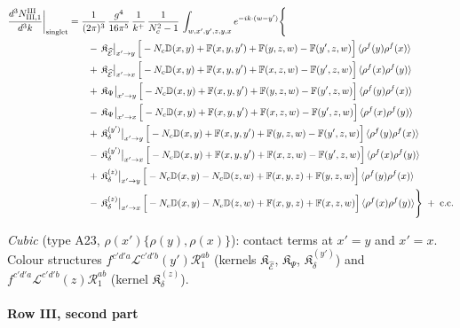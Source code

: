 \documentclass[10pt]{article}
\def\mf#1{\mathbb{#1}}
\begin{document}
\begin{align}
\frac{d^{3}N^{\rm III}_{{\rm III},1}}{d^{3}k}\bigg|_{\rm singlet}&=\frac{1}{(2\pi)^{3}}\,\frac{g^{4}}{16\pi^{5}}\,\frac{1}{k^{+}}\,\frac{1}{N_{c}^{2}-1}\,\int_{w,x',y',z,y,x}e^{-ik\cdot(w-y')}\Bigg\{\notag\\
&\qquad -\,\mathfrak{K}_{\widehat{\mathcal{E}}}\big|_{x'\to y}\,\Big[-N_{c}\mf{D}(x,y)+\mf{F}(x,y,y')+\mf{F}(y,z,w)-\mf{F}(y',z,w)\Big]\,\langle\rho^{f}(y)\rho^{f}(x)\rangle\notag\\
&\qquad +\,\mathfrak{K}_{\widehat{\mathcal{E}}}\big|_{x'\to x}\,\Big[-N_{c}\mf{D}(x,y)+\mf{F}(x,y,y')+\mf{F}(x,z,w)-\mf{F}(y',z,w)\Big]\,\langle\rho^{f}(x)\rho^{f}(y)\rangle\notag\\
&\qquad +\,\mathfrak{K}_{\Psi}\big|_{x'\to y}\,\Big[-N_{c}\mf{D}(x,y)+\mf{F}(x,y,y')+\mf{F}(y,z,w)-\mf{F}(y',z,w)\Big]\,\langle\rho^{f}(y)\rho^{f}(x)\rangle\notag\\
&\qquad -\,\mathfrak{K}_{\Psi}\big|_{x'\to x}\,\Big[-N_{c}\mf{D}(x,y)+\mf{F}(x,y,y')+\mf{F}(x,z,w)-\mf{F}(y',z,w)\Big]\,\langle\rho^{f}(x)\rho^{f}(y)\rangle\notag\\
&\qquad +\,\mathfrak{K}_{\delta}^{(y')}\big|_{x'\to y}\,\Big[-N_{c}\mf{D}(x,y)+\mf{F}(x,y,y')+\mf{F}(y,z,w)-\mf{F}(y',z,w)\Big]\,\langle\rho^{f}(y)\rho^{f}(x)\rangle\notag\\
&\qquad -\,\mathfrak{K}_{\delta}^{(y')}\big|_{x'\to x}\,\Big[-N_{c}\mf{D}(x,y)+\mf{F}(x,y,y')+\mf{F}(x,z,w)-\mf{F}(y',z,w)\Big]\,\langle\rho^{f}(x)\rho^{f}(y)\rangle\notag\\
&\qquad +\,\mathfrak{K}_{\delta}^{(z)}\big|_{x'\to y}\,\Big[-N_{c}\mf{D}(x,y)-N_{c}\mf{D}(z,w)+\mf{F}(x,y,z)+\mf{F}(y,z,w)\Big]\,\langle\rho^{f}(y)\rho^{f}(x)\rangle\notag\\
&\qquad -\,\mathfrak{K}_{\delta}^{(z)}\big|_{x'\to x}\,\Big[-N_{c}\mf{D}(x,y)-N_{c}\mf{D}(z,w)+\mf{F}(x,y,z)+\mf{F}(x,z,w)\Big]\,\langle\rho^{f}(x)\rho^{f}(y)\rangle\Bigg\}\;+\;{\rm c.c.}\label{eq:s-III-III-1}
\end{align}

\emph{Cubic} (type A23, $\rho(x')\{\rho(y),\rho(x)\}$): contact terms at $x'=y$ and $x'=x$. Colour structures $f^{c'd'a}\mathcal{L}^{c'd'b}(y')\mathcal{R}^{ab}_{1}$ (kernels $\mathfrak{K}_{\widehat{\mathcal{E}}}$, $\mathfrak{K}_{\Psi}$, $\mathfrak{K}_{\delta}^{(y')}$) and $f^{c'd'a}\mathcal{L}^{c'd'b}(z)\mathcal{R}^{ab}_{1}$ (kernel $\mathfrak{K}_{\delta}^{(z)}$).
\paragraph*{Row III, second part}
\end{document}
